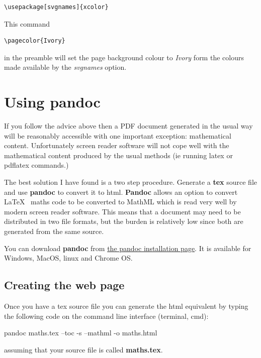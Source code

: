 \documentclass[]{article}
\begin{document}
\begin{verbatim}
\usepackage[svgnames]{xcolor}
\end{verbatim}

This command

\begin{verbatim}
\pagecolor{Ivory}
\end{verbatim}

in the preamble will set the page background colour to \emph{Ivory} form the colours made available by the \emph{svgnames} option.

\hypertarget{using-pandoc}{%
\section{\texorpdfstring{Using
\textbf{pandoc}}{Using pandoc}}\label{using-pandoc}}

If you follow the advice above then a PDF document generated in the
usual way will be reasonably accessible with one important exception:
mathematical content. Unfortunately screen reader software will not cope
well with the mathematical content produced by the usual methods (ie
running latex or pdflatex commands.)

The best solution I have found is a two step procedure. Generate a
\textbf{tex} source file and use \textbf{pandoc} to convert it to html.
\textbf{Pandoc} allows an option to convert \LaTeX~ maths code to be
converted to MathML which is read very well by modern screen reader
software. This means that a document may need to be distributed in two
file formats, but the burden is relatively low since both are generated
from the same source.

You can download \textbf{pandoc} from
\href{https://pandoc.org/installing.html}{the pandoc installation page}.
It is available for Windows, MacOS, linux and Chrome OS.

\hypertarget{creating-the-web-page}{%
\subsection{Creating the web page}\label{creating-the-web-page}}

Once you have a tex source file you can generate the html equivalent by
typing the following code on the command line interface (terminal, cmd):

pandoc maths.tex --toc -s --mathml -o maths.html

assuming that your source file is called \textbf{maths.tex}.
\end{document}
